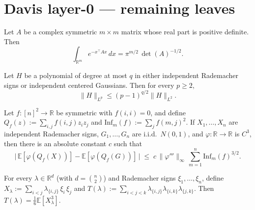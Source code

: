 
\chapter{Davis layer-0 — remaining leaves}
\label{chap:davis-l0-remaining}

\begin{lemma}
\label{lem:gaussian-quadratic-2}
Let $A$ be a complex symmetric $m \times m$ matrix whose real part is
positive definite. Then
\[
  \int_{\mathbb{R}^m} e^{-x^\top A x}\,dx = \pi^{m/2}\,\det(A)^{-1/2}.
\]
\end{lemma}

\begin{lemma}
\label{lem:hc}
Let $H$ be a polynomial of degree at most $q$ in either independent
Rademacher signs or independent centered Gaussians. Then for every
$p \ge 2$,
\[
  \|H\|_{L^p} \le (p-1)^{q/2} \|H\|_{L^2}.
\]
\end{lemma}

\begin{lemma}
\label{lem:weak-comparison}
Let $f : [n]^2 \to \mathbb{R}$ be symmetric with $f(i,i) = 0$, and define
$Q_f(z) := \sum_{i,j} f(i,j) z_i z_j$ and
$\mathrm{Inf}_m(f) := \sum_j f(m,j)^2$.
If $X_1, \dots, X_n$ are independent Rademacher signs,
$G_1, \dots, G_n$ are i.i.d.\ $N(0,1)$, and $\varphi : \mathbb{R} \to
\mathbb{R}$ is $C^3$, then there is an absolute constant $c$ such that
\[
  \bigl|\,\mathbb{E}[\varphi(Q_f(X))] - \mathbb{E}[\varphi(Q_f(G))]\,\bigr|
  \;\le\; c\,\|\varphi'''\|_\infty\,\sum_{m=1}^n \mathrm{Inf}_m(f)^{3/2}.
\]
\end{lemma}

\begin{lemma}
\label{lem:triangle}
For every $\lambda \in \mathbb{R}^d$ (with $d = \binom{n}{2}$) and Rademacher
signs $\xi_1, \dots, \xi_n$, define $X_\lambda := \sum_{i<j}
\lambda_{\{i,j\}}\,\xi_i\,\xi_j$ and
$T(\lambda) := \sum_{i<j<k}\lambda_{\{i,j\}}\lambda_{\{i,k\}}\lambda_{\{j,k\}}$.
Then $T(\lambda) = \tfrac16 \mathbb{E}[X_\lambda^3]$.
\end{lemma}

